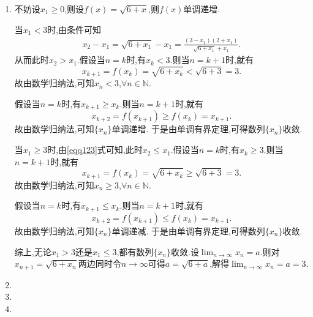 \documentclass[../../main.tex]{subfiles}
\begin{document}
\begin{solution}
\begin{enumerate}
\item 不妨设$x_1\geqslant  0$,则设\(f(x)=\sqrt{6 + x}\),则\(f(x)\)单调递增.

当\(x_1 < 3\)时,由条件可知
\begin{gather}\label{eqq123}
x_2 - x_1=\sqrt{6 + x_1}-x_1=\frac{(3 - x_1)(2 + x_1)}{\sqrt{6 + x_1}+x_1}.
\end{gather}
从而此时\(x_2 > x_1\).假设当\(n = k\)时,有\(x_k < 3\).则当\(n = k + 1\)时,就有
\[
x_{k + 1}=f(x_k)=\sqrt{6 + x_k}<\sqrt{6 + 3}=3.
\]
故由数学归纳法,可知\(x_n < 3\),\(\forall n\in\mathbb{N}\).

假设当\(n = k\)时,有\(x_{k + 1}\geqslant x_k\).则当\(n = k + 1\)时,就有
\[
x_{k + 2}=f(x_{k + 1})\geqslant f(x_k)=x_{k + 1}.
\]
故由数学归纳法,可知\(\{x_n\}\)单调递增.
于是由单调有界定理,可得数列\(\{x_n\}\)收敛.

当\(x_1\geqslant 3\)时,由\eqref{eqq123}式可知,此时\(x_2\leqslant x_1\).假设当\(n = k\)时,有\(x_k\geqslant 3\).则当\(n = k + 1\)时,就有
\[
x_{k + 1}=f(x_k)=\sqrt{6 + x_k}\geqslant\sqrt{6 + 3}=3.
\]
故由数学归纳法,可知\(x_n\geqslant 3\),\(\forall n\in\mathbb{N}\).

假设当\(n = k\)时,有\(x_{k + 1}\leqslant x_k\).则当\(n = k + 1\)时,就有
\[
x_{k + 2}=f(x_{k + 1})\leqslant f(x_k)=x_{k + 1}.
\]
故由数学归纳法,可知\(\{x_n\}\)单调递减.
于是由单调有界定理,可得数列\(\{x_n\}\)收敛.

综上,无论\(x_1 > 3\)还是\(x_1\leqslant 3\),都有数列\(\{x_n\}\)收敛.设\(\lim_{n\rightarrow\infty}x_n = a\).则对\(x_{n + 1}=\sqrt{6 + x_n}\)两边同时令\(n\rightarrow\infty\)可得\(a=\sqrt{6 + a}\),解得\(\lim_{n\rightarrow\infty}x_n = a = 3\).

\item 

\item 

\item 
\end{enumerate}

\end{solution}
\end{document}
